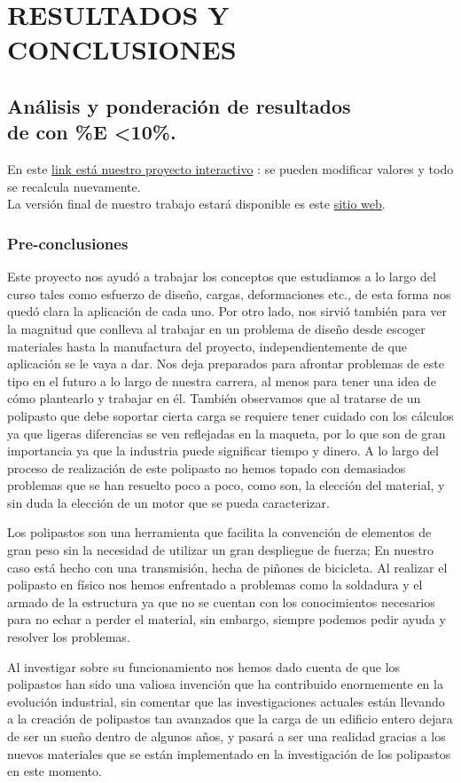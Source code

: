 
\chapter{RESULTADOS Y CONCLUSIONES}

\section{Análisis y ponderación de resultados \\de con \%E <10\%.}


En este \href{https://bit.ly/37uKJzo}{link está nuestro proyecto interactivo} : se pueden modificar valores y todo se recalcula nuevamente.
\\La versión final de nuestro trabajo estará disponible es este \href{https://erickbarcenas.github.io/Polipasto/}{sitio web}.

\subsection{Pre-conclusiones}
Este proyecto nos ayudó a trabajar los conceptos que estudiamos a lo largo del curso tales como esfuerzo de diseño, cargas, deformaciones etc., de esta forma nos quedó clara la aplicación de cada uno. Por otro lado, nos sirvió también para ver la magnitud que conlleva al trabajar en un problema de diseño desde escoger materiales hasta la manufactura del proyecto, independientemente de que aplicación se le vaya a dar.
Nos deja preparados para afrontar problemas de este tipo en el futuro a lo largo de nuestra carrera, al menos para tener una idea de cómo plantearlo y trabajar en él.
También observamos que al tratarse de un polipasto que debe soportar cierta carga se requiere tener cuidado con los cálculos ya que ligeras diferencias se ven reflejadas en la maqueta, por lo que son de gran importancia ya que la industria puede significar tiempo y dinero.
A lo largo del proceso de realización de este polipasto no hemos topado con demasiados problemas que se han resuelto poco a poco, como son, la elección del material, y sin duda la elección de un motor que se pueda caracterizar. 

Los polipastos son una herramienta que facilita la convención de elementos de gran peso sin la necesidad de utilizar un gran despliegue de fuerza; En nuestro caso está hecho con una transmisión, hecha de piñones de bicicleta. Al realizar el polipasto en físico nos hemos enfrentado a problemas como la soldadura y el armado de la estructura ya que no se cuentan con los conocimientos necesarios para no echar a perder el material, sin embargo, siempre podemos pedir ayuda y resolver los problemas.

Al investigar sobre su funcionamiento nos hemos dado cuenta de que los polipastos han sido una valiosa invención que ha contribuido enormemente en la evolución industrial, sin comentar que las investigaciones actuales están llevando a la creación de polipastos tan avanzados que la carga de un edificio entero dejara de ser un sueño dentro de algunos años, y pasará a ser una realidad gracias a los nuevos materiales que se están implementado en la investigación de los polipastos en este momento.

